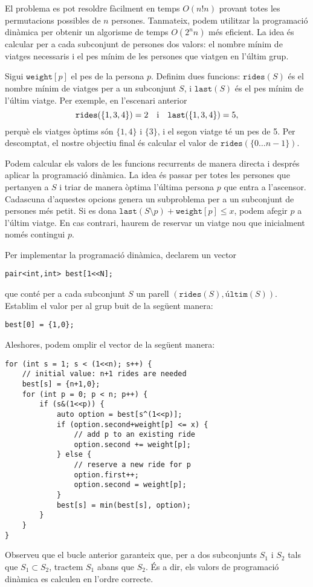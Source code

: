 El problema es pot resoldre fàcilment en temps $O(n! n)$ provant totes
les permutacions possibles de $n$ persones. Tanmateix, podem utilitzar
la programació dinàmica per obtenir un algorisme de temps $O(2^n n)$
més eficient. La idea és calcular per a cada subconjunt de persones
dos valors: el nombre mínim de viatges necessaris i el pes mínim de
les persones que viatgen en l'últim grup.

Sigui $\texttt{weight}[p]$ el pes de la persona $p$. Definim dues
funcions: $\texttt{rides}(S)$ és el nombre mínim de viatges per a un
subconjunt $S$, i $\texttt{last}(S)$ és el pes mínim de l'últim
viatge. Per exemple, en l'escenari anterior
\[ \texttt{rides}(\{1,3,4\})=2 \hspace{10px} \textrm{i}
\hspace{10px} \texttt{last}(\{1,3,4\})=5,\]
perquè els viatges òptims són
$\{1,4\}$ i $\{3\}$, i el segon viatge té un pes de 5. Per descomptat,
el nostre objectiu final és calcular el valor de $\texttt{rides}(\{0
\ldots n-1\})$.

Podem calcular els valors de les funcions recurrents de manera directa
i després aplicar la programació dinàmica. La idea és passar per totes
les persones que pertanyen a $S$ i triar de manera òptima l'última
persona $p$ que entra a l'ascensor. Cadascuna d'aquestes opcions
genera un subproblema per a un subconjunt de persones més petit. Si es
dona $\texttt{last}(S \setminus p)+\texttt{weight}[p] \le x$, podem
afegir $p$ a l'últim viatge. En cas contrari, haurem de reservar un
viatge nou que inicialment només contingui $p$.

Per implementar la programació dinàmica, declarem un vector
\begin{lstlisting}
pair<int,int> best[1<<N];
\end{lstlisting}
que conté per a cada subconjunt $S$ un parell
$(\texttt{rides}(S),\texttt{últim}(S))$. Establim el valor per al grup
buit de la següent manera:
\begin{lstlisting}
best[0] = {1,0};
\end{lstlisting}
Aleshores, podem omplir el vector de la següent manera:


\begin{lstlisting}
for (int s = 1; s < (1<<n); s++) {
    // initial value: n+1 rides are needed
    best[s] = {n+1,0};
    for (int p = 0; p < n; p++) {
        if (s&(1<<p)) {
            auto option = best[s^(1<<p)];
            if (option.second+weight[p] <= x) {
                // add p to an existing ride
                option.second += weight[p];
            } else {
                // reserve a new ride for p
                option.first++;
                option.second = weight[p];
            }
            best[s] = min(best[s], option);
        }
    }
}
\end{lstlisting}
Observeu que el bucle anterior garanteix que, per a dos
subconjunts $S_1$ i $S_2$ tals que $S_1 \subset S_2$, tractem
$S_1$ abans que $S_2$. És a dir, els valors de programació dinàmica es
calculen en l'ordre correcte.

